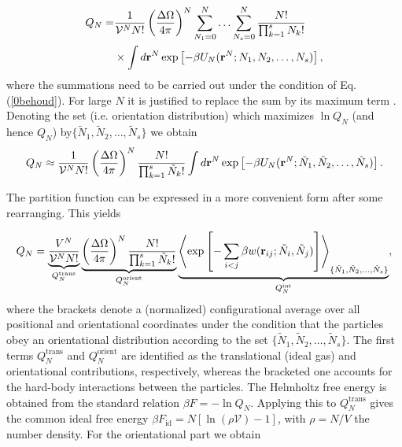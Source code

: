 {\begin{align}
Q_{N}=&\frac{1}{\mathcal{V} ^{N} N!}\left(\frac{\Delta \Omega}{4\pi}\right)^{N}
\sum_{N_{1}=0}^{N}\ldots \sum_{N_{s}=0}^{N}\frac{N!}{\prod_{k=1}^{s}N_{k}!} \nonumber \\
&\times\int d{\bf r}^{N}
\exp\left[-\beta U_{N}({\bf r}^{N}; N_{1},N_{2},\ldots,N_{s})\right], \label{0Qalgemeen}
\end{align}
where the summations need to be carried out under the condition of Eq. (\ref{0behoud}). For large $N$ it is justified to replace the sum  by its maximum term \cite{Hill}. Denoting the set (i.e. orientation distribution) which maximizes $\ln Q_{N}$ (and hence $Q_{N}$) by$\{\tilde{N}_{1},\tilde{N}_{2},\ldots,\tilde{N}_{s}\}$ we obtain
\begin{equation}
Q_{N}\approx \frac{1}{\mathcal{V} ^{N} N!}\left(\frac{\Delta \Omega}{4\pi}\right)^{N}
\frac{N!}{\prod_{k=1}^{s}\tilde{N}_{k}!}\int d{\bf r}^{N}
\exp\left[-\beta U_{N}({\bf r}^{N}; \tilde{N}_{1},\tilde{N}_{2},\ldots,\tilde{N}_{s})\right].
\end{equation}

The partition function can be expressed in a more convenient form after some rearranging. This yields

\begin{equation}
Q_{N}= \underbrace{\frac{V^{N}}{\mathcal{V} ^{N} N!}}_{Q_{N}^{\text{trans}}}
\underbrace{\left(\frac{\Delta \Omega}{4\pi}\right)^{N}
\frac{N!}{\prod_{k=1}^{s}\tilde{N}_{k}!}}_{Q_{N}^{\text{orient}}}
\underbrace{\left < \exp\left[-\sum_{i<j}\beta w({\bf r}_{ij};
\tilde{N}_{i},\tilde{N}_{j})\right] \right >_{\{\tilde{N}_{1},\tilde{N}_{2},\ldots,\tilde{N}_{s}\}}
}_{Q_{N}^{\text{int}}},
\end{equation}
where the brackets denote a (normalized) configurational average over all positional and orientational coordinates under the condition that the particles obey an orientational distribution according to the set $\{\tilde{N}_{1},\tilde{N}_{2},\ldots,\tilde{N}_{s}\}$. The first terms $Q_{N}^{\text{trans}}$ and $Q_{N}^{\text{orient}}$ are  identified as the translational (ideal gas) and orientational contributions, respectively, whereas the bracketed one accounts for the hard-body interactions between the particles. The Helmholtz free energy is obtained from the standard relation $\beta F= -\ln Q_{N}$. Applying this to $Q_{N}^{\text{trans}}$ gives the common ideal free energy $\beta F_{\text{id}}= N\left[\ln (\rho \mathcal{V})-1\right]$, with $\rho=N/V$ the number density.
For the orientational part we obtain

}
